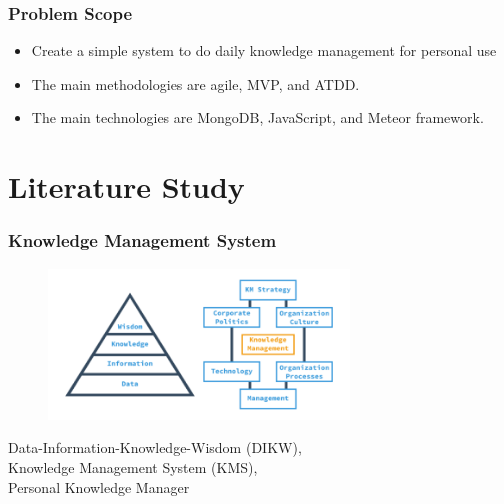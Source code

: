 \documentclass[10pt, compress]{beamer}
\begin{document}

\begin{frame}[fragile]
  \frametitle{Problem Scope}

  \begin{itemize} \itemsep0pt
    \item Create a \alert{simple system} to do \alert{daily knowledge management} for \alert{personal} use
    \item The main methodologies are \alert{agile}, \alert{MVP}, and \alert{ATDD}.
    \item The main technologies are \alert{MongoDB}, \alert{JavaScript}, and \alert{Meteor framework}.
  \end{itemize}

\end{frame}


\section{Literature Study}


\begin{frame}[fragile]
  \frametitle{Knowledge Management System}
  \centering

  \begin{figure}[ht]
    \includegraphics[width=8cm]{include/literature-kms.png}
  \end{figure}

  Data-Information-Knowledge-Wisdom (\alert{DIKW}),\\
  Knowledge Management System (\alert{KMS}),\\
  \alert{Personal Knowledge Manager}

\end{frame}

\end{document}
